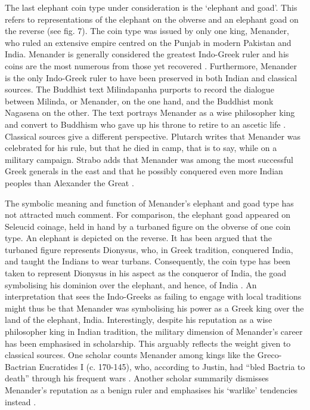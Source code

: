 \documentclass{ijsra}
\begin{document}
The last elephant coin type under consideration is the ‘elephant and goad’.
This refers to representations of the elephant on the obverse and an elephant goad on the reverse (see fig. 7). 
The coin type was issued by only one king, Menander, who ruled an extensive empire centred on the Punjab in modern Pakistan and India. 
Menander is generally considered the greatest Indo-Greek ruler and his coins are the most numerous from those yet recovered \parencite[14--17]{Bopearachchi1993}.
Furthermore, Menander is the only Indo-Greek ruler to have been preserved in both Indian and classical sources. 
The Buddhist text Milindapanha purports to record the dialogue between Milinda, or Menander, on the one hand,
and the Buddhist monk Nagasena on the other. 
The text portrays Menander as a wise philosopher king and convert to Buddhism who gave up his throne to retire to an ascetic life
\parencite[14--17]{Bopearachchi1993}. 
Classical sources give a different perspective.
Plutarch writes that Menander was celebrated for his rule, but that he died in camp, that is to say, while on a military campaign. 
Strabo adds that Menander was among the most successful Greek generals in the east and that he possibly conquered even more
Indian peoples than Alexander the Great \parencite[180, 183]{Holt1999}.

The symbolic meaning and function of Menander’s elephant and goad type has not attracted much comment. 
For comparison, the elephant goad appeared on Seleucid coinage, held in hand by a turbaned figure on the obverse of one coin type.
An elephant is depicted on the reverse. 
It has been argued that the turbaned figure represents Dionysus, who, in Greek tradition, conquered India,
and taught the Indians to wear turbans.
Consequently, the coin type has been taken to represent Dionysus in his aspect as the conqueror of India,
the goad symbolising his dominion over the elephant, and hence, of India \parencite[147--164]{Iossif2010}.
An interpretation that sees the Indo-Greeks as failing to engage with local traditions might thus be that Menander was
symbolising his power as a Greek king over the land of the elephant, India.
Interestingly, despite his reputation as a wise philosopher king in Indian tradition, the military dimension of Menander’s
career has been emphasised in scholarship. 
This arguably reflects the weight given to classical sources.
One scholar counts Menander among kings like the Greco-Bactrian Eucratides I (c. 170-145\BC), who, according to Justin,
had “bled Bactria to death” through his frequent wars \parencite[128]{Holt2005}. 
Another scholar summarily dismisses Menander’s reputation as a benign ruler and emphasises his ‘warlike’ tendencies instead \parencite[15--16]{Widemann2007}.
\end{document}
